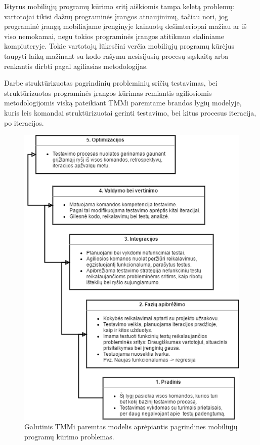 \documentclass{VUMIFPSkursinis}
\begin{document}
\bigskip
Ištyrus mobiliųjų programų kūrimo sritį aiškiomis tampa keletą problemų: vartotojai tikisi dažnų programinės įrangos atnaujinimų, tačiau nori, jog programinė įrangą mobiliajame įrenginyje kainuotų dešimteriopai mažiau ar iš viso nemokamai, negu tokios programinės įrangos atitikmuo staliniame kompiuteryje. Tokie vartotojų lūkesčiai verčia mobiliųjų programų kūrėjus taupyti laiką mažinant su kodo rašymu nesisijusių procesų sąskaitą arba renkantis dirbti pagal agiliasias metodologijas.

 Darbe struktūrizuotas pagrindinių probleminių sričių testavimas, bei struktūrizuotas programinės įrangos kūrimas remiantis agiliosiomis metodologijomis viską pateikiant TMMi paremtame brandos lygių modelyje, kuris leis komandai struktūrizuotai gerinti testavimo, bei kitus procesus iteracija, po iteracijos.
\begin{figure}[H]
    \centering
    \includegraphics[scale=0.70]{img/FinalTMMi}
    \caption{Galutinis TMMi paremtas modelis aprėpiantis pagrindines mobiliųjų programų kūrimo problemas.}
    \label{img:finaltmmi}
\end{figure}
\end{document}
